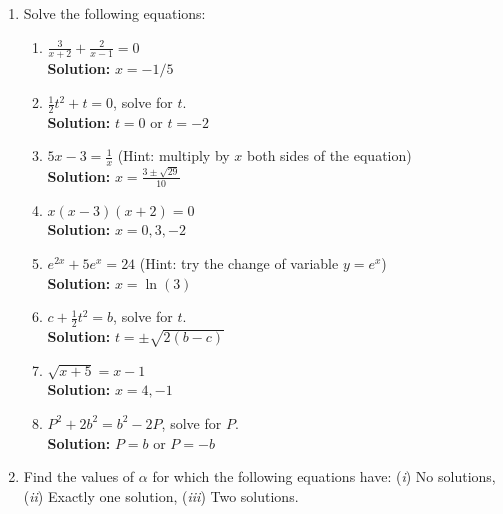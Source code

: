\documentclass{article}
\begin{document}
\begin{enumerate}[leftmargin = 0.5cm, label = \arabic*., rightmargin = 0.2cm]
    
    \item Solve the following equations:
    
    \begin{enumerate}[leftmargin = 0.5cm, label = (\alph*), rightmargin = 0.2cm]

    \item $\frac{3}{x+2} + \frac{2}{x-1} = 0$ \\
    \textbf{Solution:} \( x = -1/5 \)

    \item $\frac{1}{2}t^2 + t = 0$, solve for $t$. \\
    \textbf{Solution:} \( t = 0 \text{ or } t = -2 \)

    \item $5x - 3 = \frac{1}{x}$ (Hint: multiply by $x$ both sides of the equation) \\
    \textbf{Solution:} \( x = \frac{3\pm\sqrt{29}}{10} \)

    \item $x(x-3)(x+2) = 0$ \\
    \textbf{Solution:} \( x = 0, 3, -2 \)

    \item $e^{2x} + 5e^{x} = 24$ (Hint: try the change of variable $y = e^x$) \\
    \textbf{Solution:} \( x = \ln(3) \)

    \item $c + \frac{1}{2}t^2 = b$, solve for $t$. \\
    \textbf{Solution:} \( t = \pm \sqrt{2(b-c)} \)

    \item $\sqrt{x + 5} = x - 1$ \\
    \textbf{Solution:} \( x = 4, -1 \)

    \item $P^2 + 2b^2 = b^2 - 2P$, solve for $P$. \\
    \textbf{Solution:} \( P = b \text{ or } P = -b \)
    
    \end{enumerate}
    
    \item Find the values of $\alpha$ for which the following equations have: (\textit{i}) No solutions, (\textit{ii}) Exactly one solution, (\textit{iii}) Two solutions. 


\end{enumerate}
\end{document}
